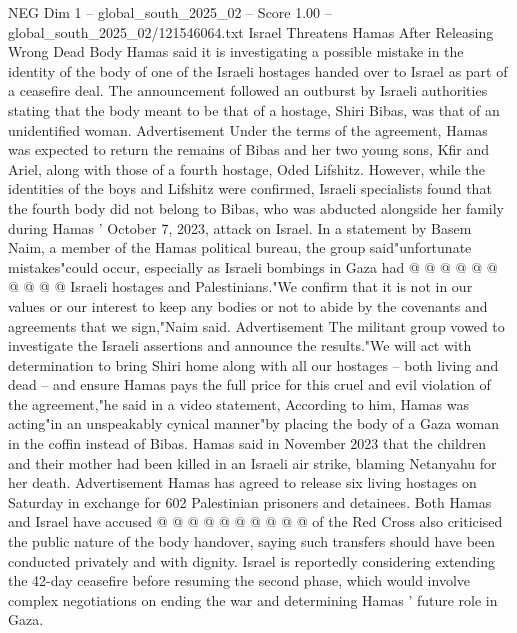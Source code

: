 \begin{textsample}{NEG Dim 1 – global\_south\_2025\_02 – Score 1.00 – global\_south\_2025\_02/121546064.txt}  \label{ex:f1_neg_031}
Israel Threatens Hamas After Releasing Wrong Dead Body Hamas said it is investigating a possible mistake in the identity of the body of one of the Israeli hostages handed over to Israel as part of a ceasefire deal.
The announcement followed an outburst by Israeli authorities stating that the body meant to be that of a hostage, Shiri Bibas, was that of an unidentified woman.
Advertisement Under the terms of the agreement, Hamas was expected to return the remains of Bibas and her two young sons, Kfir and Ariel, along with those of a fourth hostage, Oded Lifshitz.
However, while the identities of the boys and Lifshitz were confirmed, Israeli specialists found that the fourth body did not belong to Bibas, who was abducted alongside her family during Hamas ' October 7, 2023, attack on Israel.
In a statement by Basem Naim, a member of the Hamas political bureau, the group said"unfortunate mistakes"could occur, especially as Israeli bombings in Gaza had @ @ @ @ @ @ @ @ @ @ Israeli hostages and Palestinians."We confirm that it is not in our values or our interest to keep any bodies or not to abide by the covenants and agreements that we sign,"Naim said.
Advertisement The militant group vowed to investigate the Israeli assertions and announce the results."We will act with determination to bring Shiri home along with all our hostages -- both living and dead -- and ensure Hamas pays the full price for this cruel and evil violation of the agreement,"he said in a video statement, According to him, Hamas was acting"in an unspeakably cynical manner"by placing the body of a Gaza woman in the coffin instead of Bibas.
Hamas said in November 2023 that the children and their mother had been killed in an Israeli air strike, blaming Netanyahu for her death.
Advertisement Hamas has agreed to release six living hostages on Saturday in exchange for 602 Palestinian prisoners and detainees.
Both Hamas and Israel have accused @ @ @ @ @ @ @ @ @ @ of the Red Cross also criticised the public nature of the body handover, saying such transfers should have been conducted privately and with dignity.
Israel is reportedly considering extending the 42-day ceasefire before resuming the second phase, which would involve complex negotiations on ending the war and determining Hamas ' future role in Gaza.

\end{textsample}
